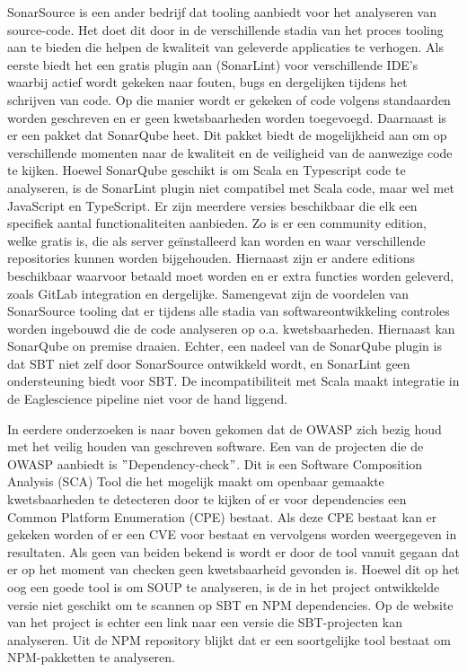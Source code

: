 SonarSource is een ander bedrijf dat tooling aanbiedt voor het analyseren van source-code. Het doet dit door in de verschillende stadia van het proces tooling aan te bieden die helpen de kwaliteit van geleverde applicaties te verhogen. Als eerste biedt het een gratis plugin aan (SonarLint) voor verschillende IDE's waarbij actief wordt gekeken naar fouten, bugs en dergelijken tijdens het schrijven van code. Op die manier wordt er gekeken of code volgens standaarden worden geschreven en er geen kwetsbaarheden worden toegevoegd. Daarnaast is er een pakket dat SonarQube heet. Dit pakket biedt de mogelijkheid aan om op verschillende momenten naar de kwaliteit en de veiligheid van de aanwezige code te kijken. Hoewel SonarQube geschikt is om Scala en Typescript code te analyseren, is de SonarLint plugin niet compatibel met Scala code, maar wel met JavaScript en TypeScript. Er zijn meerdere versies beschikbaar die elk een specifiek aantal functionaliteiten aanbieden. Zo is er een community edition, welke gratis is, die als server geïnstalleerd kan worden en waar verschillende repositories kunnen worden bijgehouden. Hiernaast zijn er andere editions beschikbaar waarvoor betaald moet worden en er extra functies worden geleverd, zoals GitLab integration en dergelijke. Samengevat zijn de voordelen van SonarSource tooling dat er tijdens alle stadia van softwareontwikkeling controles worden ingebouwd die de code analyseren op o.a. kwetsbaarheden. Hiernaast kan SonarQube on premise draaien. Echter, een nadeel van de SonarQube plugin is dat SBT niet zelf door SonarSource ontwikkeld wordt, en SonarLint geen ondersteuning biedt voor SBT. De incompatibiliteit met Scala maakt integratie in de Eaglescience pipeline niet voor de hand liggend.

In eerdere onderzoeken is naar boven gekomen dat de OWASP zich bezig houd met het veilig houden van geschreven software. Een van de projecten die de OWASP aanbiedt is $"$Dependency-check$"$. Dit is een Software Composition Analysis (SCA) Tool die het mogelijk maakt om openbaar gemaakte kwetsbaarheden te detecteren door te kijken of er voor dependencies een Common Platform Enumeration (CPE) bestaat. Als deze CPE bestaat kan er gekeken worden of er een CVE voor bestaat en vervolgens worden weergegeven in resultaten. Als geen van beiden bekend is wordt er door de tool vanuit gegaan dat er op het moment van checken geen kwetsbaarheid gevonden is. Hoewel dit op het oog een goede tool is om SOUP te analyseren, is de in het project ontwikkelde versie niet geschikt om te scannen op SBT en NPM dependencies. Op de website van het project is echter een link naar een versie die SBT-projecten kan analyseren. Uit de NPM repository blijkt dat er een soortgelijke tool bestaat om NPM-pakketten te analyseren.

